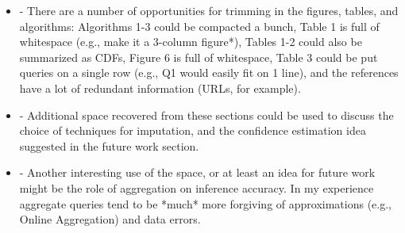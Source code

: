 \documentclass[draft,12pt]{article}
\newcommand{\resp}[1]{{\color{blue}{#1}}}
\begin{document}
\begin{itemize}
    \resp{For our purposes, imputation over the raw data is a reasonable ground truth. This
        is because the analyst, in practice, should be considering the tradeoffs on quality
        and performance of using ImputeDB versus a production imputation system on the raw
        data. Unfortunately, they would never have access to a real ground truth in such a
        scenario, and moreover, finding ground truth for use even in an empirical evaluation
        of imputation methods can be challenging because artificially dirtying the data
        often does not capture the complex reasons for missingness in real world datasets.
        We update the discussion in S4.4.1 to emphasize this point.}

\item - There are a number of opportunities for trimming in the figures, tables, and algorithms: Algorithms 1-3 could be compacted a bunch, Table 1 is full of whitespace (e.g., make it a 3-column {figure*}), Tables 1-2 could also be summarized as CDFs, Figure 6 is full of whitespace, Table 3 could be put queries on a single row (e.g., Q1 would easily fit on 1 line), and the references have a lot of redundant information (URLs, for example). 

\item - Additional space recovered from these sections could be used to discuss the choice of techniques for imputation, and the confidence estimation idea suggested in the future work section. 

\item - Another interesting use of the space, or at least an idea for future work might be the role of aggregation on inference accuracy. In my experience aggregate queries tend to be *much* more forgiving of approximations (e.g., Online Aggregation) and data errors.
\end{itemize}
\end{document}
